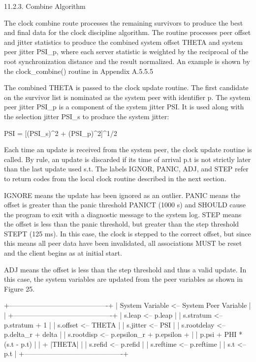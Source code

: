 11.2.3.  Combine Algorithm

   The clock combine route processes the remaining survivors to produce
   the best and final data for the clock discipline algorithm.  The
   routine processes peer offset and jitter statistics to produce the
   combined system offset THETA and system peer jitter PSI_p, where each
   server statistic is weighted by the reciprocal of the root
   synchronization distance and the result normalized.  An example is
   shown by the clock_combine() routine in Appendix A.5.5.5

   The combined THETA is passed to the clock update routine.  The first
   candidate on the survivor list is nominated as the system peer with
   identifier p.  The system peer jitter PSI_p is a component of the
   system jitter PSI.  It is used along with the selection jitter PSI_s
   to produce the system jitter:

   PSI = [(PSI_s)^2 + (PSI_p)^2]^1/2

   Each time an update is received from the system peer, the clock
   update routine is called.  By rule, an update is discarded if its
   time of arrival p.t is not strictly later than the last update used
   s.t.  The labels IGNOR, PANIC, ADJ, and STEP refer to return codes
   from the local clock routine described in the next section.

   IGNORE means the update has been ignored as an outlier.  PANIC means
   the offset is greater than the panic threshold PANICT (1000 s) and
   SHOULD cause the program to exit with a diagnostic message to the
    system log.  STEP means the offset is less than the panic threshold,
   but greater than the step threshold STEPT (125 ms).  In this case,
   the clock is stepped to the correct offset, but since this means all
   peer data have been invalidated, all associations MUST be reset and
   the client begins as at initial start.

   ADJ means the offset is less than the step threshold and thus a valid
   update.  In this case, the system variables are updated from the peer
   variables as shown in Figure 25.

                  +-------------------------------------------+
                  | System Variable <-- System Peer Variable  |        |
                  +-------------------------------------------+
                  | s.leap      <-- p.leap                    |
                  | s.stratum   <-- p.stratum + 1             |
                  | s.offset    <-- THETA                     |
                  | s.jitter    <-- PSI                       |
                  | s.rootdelay <-- p.delta_r + delta         |
                  | s.rootdisp  <-- p.epsilon_r + p.epsilon + |
                  |                 p.psi + PHI * (s.t - p.t) |
                  |                 + |THETA|                 |
                  | s.refid     <-- p.refid                   |
                  | s.reftime   <-- p.reftime                 |
                  | s.t         <-- p.t                       |
                  +-------------------------------------------+

